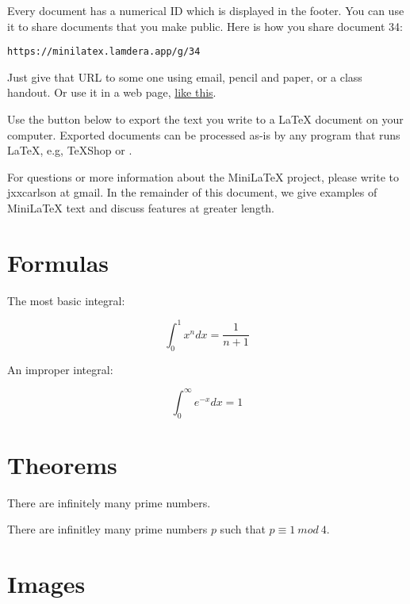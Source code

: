  Every document has a numerical ID which is displayed in the footer.  You can use it to share documents that you make public. Here is how you share document 34:

\begin{verbatim}
https://minilatex.lamdera.app/g/34
\end{verbatim}

Just give that URL to some one using email, pencil and paper, or a class handout.  Or use it in a web page, \href{https://minilatex.lamdera.app/g/34}{like this}.

 Use the  button below to export the text you write to a
LaTeX document on your computer. Exported documents can
be processed as-is by any program that runs LaTeX,
e.g, TeXShop or .


For questions or more information about
the MiniLaTeX project, please  write to jxxcarlson at gmail.  In the remainder of this document, we give examples of MiniLaTeX text and discuss features at greater length.

\section{Formulas}


The most basic integral:

\begin{equation}
\label{integral:xn}
\int_0^1 x^n dx = \frac{1}{n+1}
\end{equation}

An improper integral:

\begin{equation}
\label{integral:exp}
\int_0^\infty e^{-x} dx = 1
\end{equation}

\section{Theorems}

\begin{theorem}
There are infinitely many prime numbers.
\end{theorem}

\begin{theorem}
There are infinitley many prime numbers
$p$ such that $p \equiv 1\ mod\ 4$.
\end{theorem}

\section{Images}

